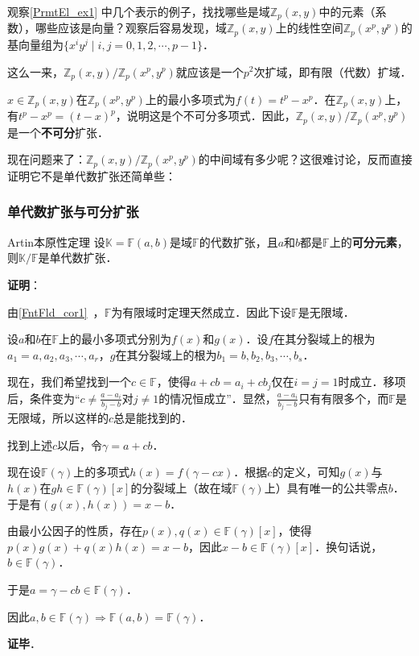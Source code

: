 观察\autoref{PrmtEl_ex1} 中几个表示的例子，找找哪些是域$\mathbb{Z}_p(x, y)$中的元素（系数），哪些应该是向量？观察后容易发现，域$\mathbb{Z}_p(x, y)$上的线性空间$\mathbb{Z}_p(x^p, y^p)$的基向量组为$\{x^iy^j\mid i, j=0, 1, 2, \cdots, p-1\}$．

这么一来，$\mathbb{Z}_p(x, y)/\mathbb{Z}_p(x^p, y^p)$就应该是一个$p^2$次扩域，即有限（代数）扩域．

$x\in\mathbb{Z}_p(x, y)$在$\mathbb{Z}_p(x^p, y^p)$上的最小多项式为$f(t)=t^p-x^p$．在$\mathbb{Z}_p(x, y)$上，有$t^p-x^p=(t-x)^p$，说明这是个不可分多项式．因此，$\mathbb{Z}_p(x, y)/\mathbb{Z}_p(x^p, y^p)$是一个\textbf{不可分}扩张．

现在问题来了：$\mathbb{Z}_p(x, y)/\mathbb{Z}_p(x^p, y^p)$的中间域有多少呢？这很难讨论，反而直接证明它不是单代数扩张还简单些：






\subsubsection{单代数扩张与可分扩张}


\begin{corollary}{Artin本原性定理}
设$\mathbb{K}=\mathbb{F}(a, b)$是域$\mathbb{F}$的代数扩张，且$a$和$b$都是$\mathbb{F}$上的\textbf{可分元素}，则$\mathbb{K}/\mathbb{F}$是单代数扩张．
\end{corollary}

\textbf{证明}：

由\autoref{FntFld_cor1}~，$\mathbb{F}$为有限域时定理天然成立．因此下设$\mathbb{F}$是无限域．

设$a$和$b$在$\mathbb{F}$上的最小多项式分别为$f(x)$和$g(x)$．设$f$在其分裂域上的根为$a_1=a, a_2, a_3, \cdots, a_r$，$g$在其分裂域上的根为$b_1=b, b_2, b_3, \cdots, b_s$．

现在，我们希望找到一个$c\in\mathbb{F}$，使得$a+cb=a_i+cb_j$仅在$i=j=1$时成立．移项后，条件变为“$c\neq\frac{a-a_i}{b_j-b}$对$j\neq 1$的情况恒成立”．显然，$\frac{a-a_i}{b_j-b}$只有有限多个，而$\mathbb{F}$是无限域，所以这样的$c$总是能找到的．

找到上述$c$以后，令$\gamma=a+cb$．

现在设$\mathbb{F}(\gamma)$上的多项式$h(x)=f(\gamma-cx)$．根据$c$的定义，可知$g(x)$与$h(x)$在$gh\in\mathbb{F}(\gamma)[x]$的分裂域上（故在域$\mathbb{F}(\gamma)$上）具有唯一的公共零点$b$．于是有$(g(x), h(x))=x-b$．

由最小公因子的性质，存在$p(x), q(x)\in\mathbb{F}(\gamma)[x]$，使得$p(x)g(x)+q(x)h(x)=x-b$，因此$x-b\in\mathbb{F}(\gamma)[x]$．换句话说，$b\in\mathbb{F}(\gamma)$．

于是$a=\gamma-cb\in\mathbb{F}(\gamma)$．

因此$a, b\in\mathbb{F}(\gamma)\Rightarrow \mathbb{F}(a, b)=\mathbb{F}(\gamma)$．

\textbf{证毕}．




























